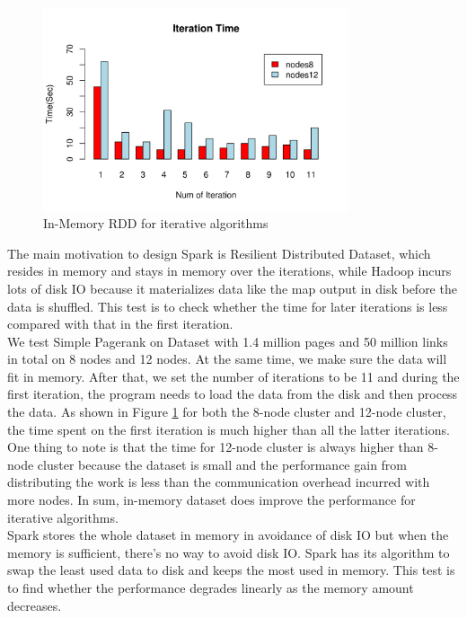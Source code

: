 \documentclass{article}
\begin{document}
\begin{figure}[H]
        \centering
        \includegraphics[width=90mm]{images/in-mem.png}
        \caption{In-Memory RDD for iterative algorithms}
        \label{fig:in-memory}
    \end{figure}

The main motivation to design Spark is Resilient Distributed Dataset, which resides in memory and stays in memory over the iterations, while Hadoop incurs lots of disk IO because it materializes data like the map output in disk before the data is shuffled. This test is to check whether the time for later iterations is less compared with that in the first iteration.\\


We test Simple Pagerank on Dataset with 1.4 million pages and 50 million links in total on 8 nodes and 12 nodes. At the same time, we make sure the data will fit in memory. After that, we set the number of iterations to be 11 and during the first iteration, the program needs to load the data from the disk and then process the data. As shown in Figure \ref{fig:in-memory} for both the 8-node cluster and 12-node cluster, the time spent on the first iteration is much higher than all the latter iterations. One thing to note is that the time for 12-node cluster is always higher than 8-node cluster because the dataset is small and the performance gain from distributing the work is less than the communication overhead incurred with more nodes. In sum, in-memory dataset does improve the performance for iterative algorithms.\\

Spark stores the whole dataset in memory in avoidance of disk IO but when the memory is sufficient, there’s no way to avoid disk IO. Spark has its algorithm to swap the least used data to disk and keeps the most used in memory. This test is to find whether the performance degrades linearly as the memory amount decreases.\\
\end{document}
